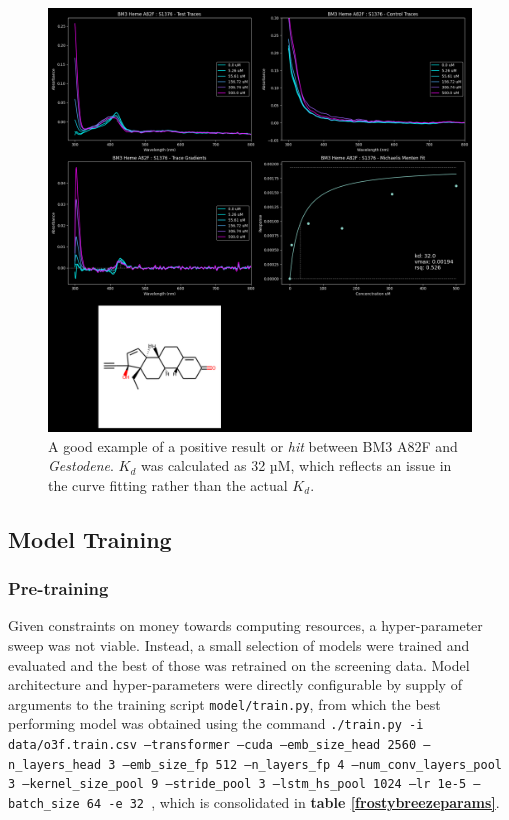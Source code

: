 \documentclass{article}
\begin{document}
\begin{figure}
	\caption{\label{screeninghit} A good example of a positive result or \textit{hit} between BM3 A82F and \textit{Gestodene}. $K_d$ was calculated as 32 µM, which reflects an issue in the curve fitting rather than the actual $K_d$.}
	\includegraphics[width = \textwidth]{img/BM3-Heme-A82F:S1376.png}
\end{figure}

\subsection{Model Training}

\subsubsection{Pre-training}

Given constraints on money towards computing resources, a hyper-parameter sweep was not viable.
Instead, a small selection of models were trained and evaluated and the best of those was retrained on the screening data.
Model architecture and hyper-parameters were directly configurable by supply of arguments to the training script \texttt{model/train.py}, from which the best performing model was obtained using the command \texttt{./train.py -i data/o3f.train.csv --transformer --cuda --emb\_size\_head 2560 --n\_layers\_head 3 --emb\_size\_fp 512 --n\_layers\_fp 4 --num\_conv\_layers\_pool 3 --kernel\_size\_pool 9 --stride\_pool 3 --lstm\_hs\_pool 1024 --lr 1e-5 --batch\_size 64 -e 32
}, which is consolidated in \textbf{table \ref{frostybreezeparams}}.
\end{document}
